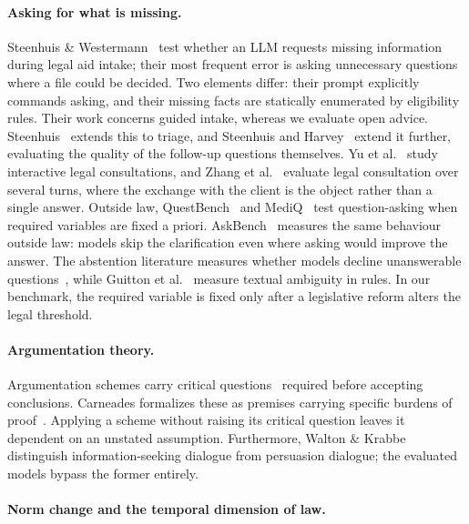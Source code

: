 \documentclass{IOS-Book-Article}
\begin{document}
\paragraph{Asking for what is missing.}

Steenhuis \& Westermann~\cite{steenhuis2024} test whether an LLM requests missing information during legal aid intake; their most frequent error is asking unnecessary questions where a file could be decided. Two elements differ: their prompt explicitly commands asking, and their missing facts are statically enumerated by eligibility rules. Their work concerns guided intake, whereas we evaluate open advice. Steenhuis~\cite{steenhuis2025} extends this to triage, and Steenhuis and Harvey~\cite{steenhuis2026} extend it further, evaluating the quality of the follow-up questions themselves. Yu et al.~\cite{yu2025} study interactive legal consultations, and Zhang et al.~\cite{dlawbench} evaluate legal consultation over several turns, where the exchange with the client is the object rather than a single answer. Outside law, QuestBench~\cite{questbench} and MediQ~\cite{mediq} test question-asking when required variables are fixed a priori. AskBench~\cite{askbench} measures the same behaviour outside law: models skip the clarification even where asking would improve the answer. The abstention literature measures whether models decline unanswerable questions~\cite{rajpurkar2018}, while Guitton et al.~\cite{guitton2025} measure textual ambiguity in rules. In our benchmark, the required variable is fixed only after a legislative reform alters the legal threshold.

\paragraph{Argumentation theory.}

Argumentation schemes carry critical questions~\cite{waltonschemes2008} required before accepting conclusions. Carneades formalizes these as premises carrying specific burdens of proof~\cite{gordon2007}. Applying a scheme without raising its critical question leaves it dependent on an unstated assumption. Furthermore, Walton \& Krabbe~\cite{waltonkrabbe1995} distinguish information-seeking dialogue from persuasion dialogue; the evaluated models bypass the former entirely.

\paragraph{Norm change and the temporal dimension of law.}
\end{document}
